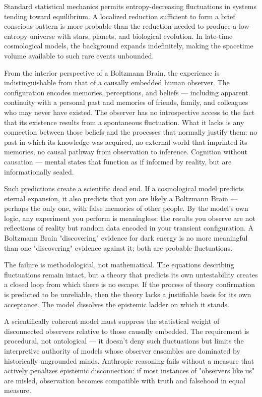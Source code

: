 Standard statistical mechanics permits entropy-decreasing fluctuations in systems tending toward equilibrium. A localized reduction sufficient to form a brief conscious pattern is more probable than the reduction needed to produce a low-entropy universe with stars, planets, and biological evolution. In late-time cosmological models, the background expands indefinitely, making the spacetime volume available to such rare events unbounded.

From the interior perspective of a Boltzmann Brain, the experience is indistinguishable from that of a causally embedded human observer. The configuration encodes memories, perceptions, and beliefs — including apparent continuity with a personal past and memories of friends, family, and colleagues who may never have existed. The observer has no introspective access to the fact that its existence results from a spontaneous fluctuation. What it lacks is any connection between those beliefs and the processes that normally justify them: no past in which its knowledge was acquired, no external world that imprinted its memories, no causal pathway from observation to inference. Cognition without causation — mental states that function as if informed by reality, but are informationally sealed.

Such predictions create a scientific dead end. If a cosmological model predicts eternal expansion, it also predicts that you are likely a Boltzmann Brain — perhaps the only one, with false memories of other people. By the model's own logic, any experiment you perform is meaningless: the results you observe are not reflections of reality but random data encoded in your transient configuration. A Boltzmann Brain "discovering" evidence for dark energy is no more meaningful than one "discovering" evidence against it; both are probable fluctuations.

The failure is methodological, not mathematical. The equations describing fluctuations remain intact, but a theory that predicts its own untestability creates a closed loop from which there is no escape. If the process of theory confirmation is predicted to be unreliable, then the theory lacks a justifiable basis for its own acceptance. The model dissolves the epistemic ladder on which it stands.

A scientifically coherent model must suppress the statistical weight of disconnected observers relative to those causally embedded. The requirement is procedural, not ontological — it doesn't deny such fluctuations but limits the interpretive authority of models whose observer ensembles are dominated by historically ungrounded minds. Anthropic reasoning fails without a measure that actively penalizes epistemic disconnection: if most instances of "observers like us" are misled, observation becomes compatible with truth and falsehood in equal measure.

